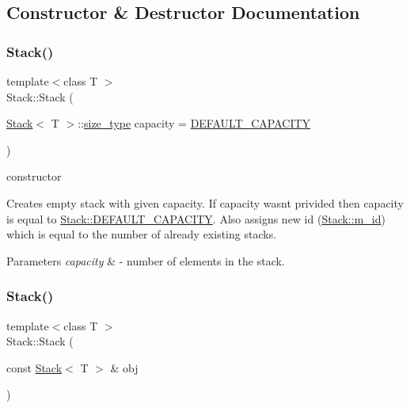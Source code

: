 \subsection{Constructor \& Destructor Documentation}
\mbox{\label{class_my_namespace_1_1_stack_a303e8345a585ffac7457f57ac920a54f}} 
\subsubsection{\texorpdfstring{Stack()}{Stack()}\hspace{0.1cm}{\footnotesize\ttfamily [1/2]}}
{\footnotesize\ttfamily template$<$class T $>$ \\
Stack\+::\+Stack (\begin{DoxyParamCaption}\item[{\hyperlink{class_my_namespace_1_1_stack}{Stack}$<$ T $>$\+::\hyperlink{class_my_namespace_1_1_stack_a19c43f92e11d91ed645058833af88a86}{size\+\_\+type}}]{capacity = {\ttfamily \hyperlink{class_my_namespace_1_1_stack_a4b75778037e106878d008d6a859dad27}{D\+E\+F\+A\+U\+L\+T\+\_\+\+C\+A\+P\+A\+C\+I\+TY}} }\end{DoxyParamCaption})}



constructor 

Creates empty stack with given capacity. If capacity wasn\textquotesingle{}t privided then capacity is equal to \hyperlink{class_my_namespace_1_1_stack_a4b75778037e106878d008d6a859dad27}{Stack\+::\+D\+E\+F\+A\+U\+L\+T\+\_\+\+C\+A\+P\+A\+C\+I\+TY}. Also assigns new id (\hyperlink{class_my_namespace_1_1_stack_a0805ceeb13ebf75b9414f174f7cbaaa5}{Stack\+::m\+\_\+id}) which is equal to the number of already existing stacks.


\begin{DoxyParams}{Parameters}
{\em capacity} & -\/ number of elements in the stack. \\
\hline
\end{DoxyParams}
\mbox{\label{class_my_namespace_1_1_stack_ac6edf3e896990925caf2acc2939066bd}} 
\subsubsection{\texorpdfstring{Stack()}{Stack()}\hspace{0.1cm}{\footnotesize\ttfamily [2/2]}}
{\footnotesize\ttfamily template$<$class T $>$ \\
Stack\+::\+Stack (\begin{DoxyParamCaption}\item[{const \hyperlink{class_my_namespace_1_1_stack}{Stack}$<$ T $>$ \&}]{obj }\end{DoxyParamCaption})}



